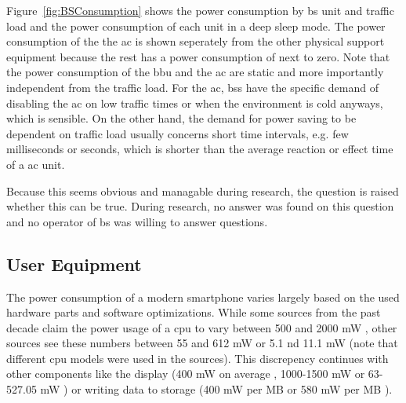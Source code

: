 \documentclass[11pt,a4paper]{article}
\begin{document}
Figure~\ref{fig:BSConsumption} shows the power consumption by \acrshort{bs} unit and traffic load and the power consumption of each unit in a deep sleep mode.
The power consumption of the the \acrshort{ac} is shown seperately from the other physical support equipment because the rest has a power consumption of next to zero.  
Note that the power consumption of the \acrshort{bbu} and the \acrshort{ac} are static and more importantly independent from the traffic load.
For the \acrlong{ac}, \acrlong{bs}s have the specific demand of disabling the \acrshort{ac} on low traffic times or when the environment is cold anyways, which is sensible.
On the other hand, the demand for power saving to be dependent on traffic load usually concerns short time intervals, e.g. few milliseconds or seconds, which is shorter than the average reaction or effect time of a \acrlong{ac} unit.

Because this seems obvious and managable during research, the question is raised whether this can be true.
During research, no answer was found on this question and no operator of \acrshort{bs} was willing to answer questions.

\subsection{User Equipment}\label{subsec:UEConsumption}

The power consumption of a modern smartphone varies largely based on the used hardware parts and software optimizations.
While some sources from the past decade claim the power usage of a \acrshort{cpu} to vary between 500 and 2000 mW \citep{smartphoneEnergyConsumption}, other sources see these numbers between 55 and 612 mW \citep{smartphoneEnergySurvey} or 5.1 nd 11.1 mW \citep{mobileEnergyConsumption} (note that different \acrshort{cpu} models were used in the sources).
This discrepency continues with other components like the display (400 mW on average \citep{smartphoneEnergyConsumption}, 1000-1500 mW \citep{powerUsageSmartphonesQnovo} or 63-527.05 mW \citep{smartphoneEnergySurvey}) or writing data to storage (400 mW per MB \citep{powerUsageSmartphonesQnovo} or 580 mW per MB \citep{smartphoneEnergySurvey}).
\end{document}
